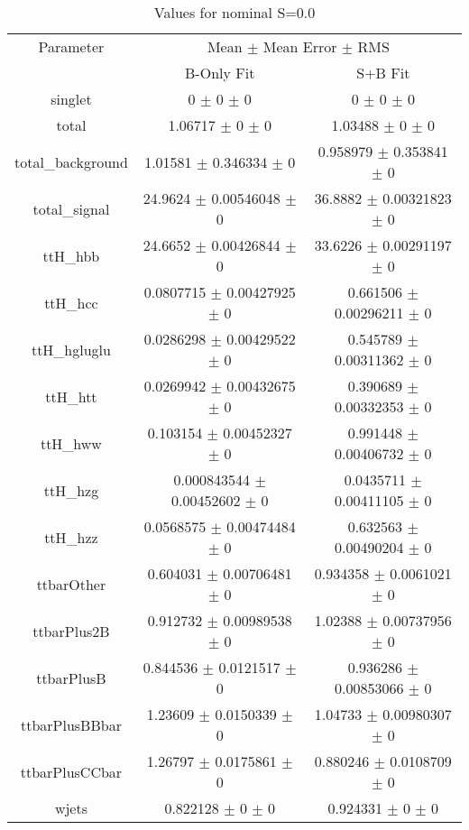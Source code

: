 \begin{table}
\centering
\caption{Values for nominal S=0.0}
\begin{tabular}{ccc}
\toprule
Parameter & \multicolumn{2}{c}{Mean $\pm$ Mean Error $\pm$ RMS}\\
 & B-Only Fit & S+B Fit\\
\midrule
singlet & \num{0} $\pm$ \num{0} $\pm$ \num{0} & \num{0} $\pm$ \num{0} $\pm$ \num{0}\\
total & \num{1.06717} $\pm$ \num{0} $\pm$ \num{0} & \num{1.03488} $\pm$ \num{0} $\pm$ \num{0}\\
total\_background & \num{1.01581} $\pm$ \num{0.346334} $\pm$ \num{0} & \num{0.958979} $\pm$ \num{0.353841} $\pm$ \num{0}\\
total\_signal & \num{24.9624} $\pm$ \num{0.00546048} $\pm$ \num{0} & \num{36.8882} $\pm$ \num{0.00321823} $\pm$ \num{0}\\
ttH\_hbb & \num{24.6652} $\pm$ \num{0.00426844} $\pm$ \num{0} & \num{33.6226} $\pm$ \num{0.00291197} $\pm$ \num{0}\\
ttH\_hcc & \num{0.0807715} $\pm$ \num{0.00427925} $\pm$ \num{0} & \num{0.661506} $\pm$ \num{0.00296211} $\pm$ \num{0}\\
ttH\_hgluglu & \num{0.0286298} $\pm$ \num{0.00429522} $\pm$ \num{0} & \num{0.545789} $\pm$ \num{0.00311362} $\pm$ \num{0}\\
ttH\_htt & \num{0.0269942} $\pm$ \num{0.00432675} $\pm$ \num{0} & \num{0.390689} $\pm$ \num{0.00332353} $\pm$ \num{0}\\
ttH\_hww & \num{0.103154} $\pm$ \num{0.00452327} $\pm$ \num{0} & \num{0.991448} $\pm$ \num{0.00406732} $\pm$ \num{0}\\
ttH\_hzg & \num{0.000843544} $\pm$ \num{0.00452602} $\pm$ \num{0} & \num{0.0435711} $\pm$ \num{0.00411105} $\pm$ \num{0}\\
ttH\_hzz & \num{0.0568575} $\pm$ \num{0.00474484} $\pm$ \num{0} & \num{0.632563} $\pm$ \num{0.00490204} $\pm$ \num{0}\\
ttbarOther & \num{0.604031} $\pm$ \num{0.00706481} $\pm$ \num{0} & \num{0.934358} $\pm$ \num{0.0061021} $\pm$ \num{0}\\
ttbarPlus2B & \num{0.912732} $\pm$ \num{0.00989538} $\pm$ \num{0} & \num{1.02388} $\pm$ \num{0.00737956} $\pm$ \num{0}\\
ttbarPlusB & \num{0.844536} $\pm$ \num{0.0121517} $\pm$ \num{0} & \num{0.936286} $\pm$ \num{0.00853066} $\pm$ \num{0}\\
ttbarPlusBBbar & \num{1.23609} $\pm$ \num{0.0150339} $\pm$ \num{0} & \num{1.04733} $\pm$ \num{0.00980307} $\pm$ \num{0}\\
ttbarPlusCCbar & \num{1.26797} $\pm$ \num{0.0175861} $\pm$ \num{0} & \num{0.880246} $\pm$ \num{0.0108709} $\pm$ \num{0}\\
wjets & \num{0.822128} $\pm$ \num{0} $\pm$ \num{0} & \num{0.924331} $\pm$ \num{0} $\pm$ \num{0}\\
\bottomrule
\end{tabular}
\end{table}